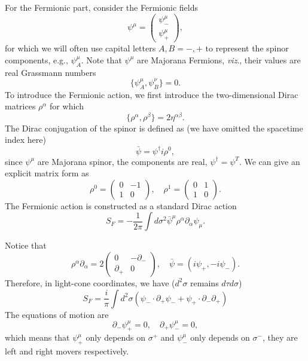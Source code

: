 \documentclass[graybox,envcountchap,sectrefs]{svmono}
\begin{document}
For the Fermionic part, consider the Fermionic fields 
\begin{equation}
\psi^{\mu}=\left(\begin{array}{c} 
\psi^{\mu}_{-} \\ \psi^{\mu}_{+}	
\end{array}
 \right),	
\end{equation}
for which we will often use capital letters $A,B=-,+$ to represent the spinor components, e.g., $\psi^{\mu}_A$.
Note that $\psi^{\mu}$ are Majorana Fermions, \emph{viz}., their values are real Grassmann numbers
\begin{equation}
\{\psi^{\mu}_A,\psi^{\nu}_B\}=0.	
\end{equation}
To introduce the Fermionic action, we first introduce the two-dimensional Dirac matrices $\rho^{\alpha}$ for which
\begin{equation}
	\{\rho^{\alpha},\rho^{\beta}\}=2\eta^{\alpha\beta}.
\end{equation}
The Dirac conjugation of the spinor is defined as (we have omitted the spacetime index here)
\begin{equation}
\bar{\psi}=\psi^{\dagger}i\rho^{0},	
\end{equation}
since $\psi^{\mu}$ are Majorana spinor, the components are real, $\psi^{\dagger}=\psi^{T}$.
We can give an explicit matrix form as
\begin{equation}
\rho^0=\left(\begin{array}{cc}
0&-1\\
1&0	
\end{array}
 \right),\quad 	\rho^1=\left(\begin{array}{cc}
0&1\\
1&0	
\end{array}
 \right).
\end{equation}
The Fermionic action is constructed as a standard Dirac action
\begin{equation}
S_F=-\frac{1}{2\pi}\int	d\sigma^2 \bar{\psi}^{\mu}\rho^{\alpha}\partial_{\alpha}\psi_{\mu}.
\end{equation}




Notice that
\begin{equation}
\rho^{\alpha}\partial_{\alpha}=2\left(
\begin{array}{cc}
	0 & -\partial_{-}\\
	\partial_{+} & 0
\end{array}
\right)	,\quad
 \bar{\psi}=(i\psi_{+},-i\psi_{-}).
\end{equation}
Therefore, in light-cone coordinates, we have ($d^2\sigma$ remains $d\tau d\sigma$)
\begin{equation}
	S_F=\frac{i}{\pi}\int d^2\sigma \left(
	\psi_{-}\cdot \partial_{+}\psi_{-}+\psi_{+} \cdot \partial_{-}\partial_{+}
	\right)
\end{equation}
The equations of motion are 
\begin{equation}
\partial_{-}\psi_{+}^{\mu}=0, \quad \partial_{+}\psi_{-}^{\mu}=0	,
\end{equation}
which means that $\psi_+^{\mu}$ only depends on $\sigma^+$ and $\psi_-^{\mu}$ only depends on $\sigma^-$, they are left and right movers respectively.
\end{document}
